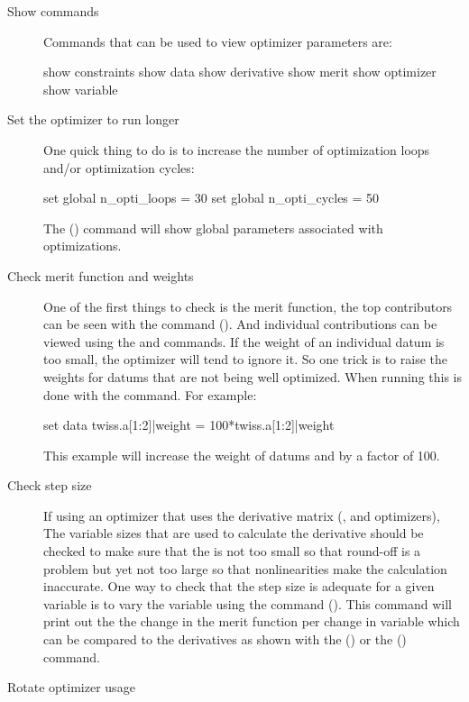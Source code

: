 {{{{{{{{\begin{description}
%
\item[Show commands] \Newline
Commands that can be used to view optimizer parameters are:
\begin{example}
  show constraints
  show data
  show derivative
  show merit
  show optimizer
  show variable
\end{example}
%
\item[Set the optimizer to run longer] \Newline
One quick thing to do is to increase the number of optimization loops and/or optimization cycles:
\begin{example}
	set global n_opti_loops = 30
	set global n_opti_cycles = 50
\end{example}
The  () command will show global parameters
associated with optimizations.
%
\item[Check merit function and weights] \Newline
One of the first things to check is the merit function, the top contributors can be seen with the
command  (). And individual contributions can be viewed using the
 and  commands. If the weight of an individual datum is too small,
the optimizer will tend to ignore it. So one trick is to raise the weights for datums that are not
being well optimized. When running \tao this is done with the  command. For example:
\begin{example}
  set data twiss.a[1:2]|weight = 100*twiss.a[1:2]|weight
\end{example}
This example will increase the weight of datums  and  by a factor of
100.
%
\item[Check step size] \Newline
If using an optimizer that uses the derivative matrix (,  and 
optimizers), The variable  sizes that are used to calculate the derivative should be
checked to make sure that the  is not too small so that round-off is a problem but yet not
too large so that nonlinearities make the calculation inaccurate. One way to check that the step
size is adequate for a given variable is to vary the variable using the command 
(). This command will print out the the change in the merit function per change in
variable which can be compared to the derivatives as shown with the 
() or the  () command.
%
\item[Rotate optimizer usage] \Newline

\end{description}}}}}}}}}
